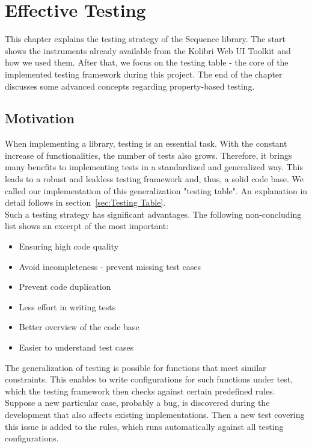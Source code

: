 \chapter{Effective Testing}
\label{chap:Effective_Testing}
This chapter explains the testing strategy of the Sequence library. The start
shows the instruments already available from the Kolibri Web UI Toolkit and how
we used them. After that, we focus on the testing table - the core of
the implemented testing framework during this project. The end of the chapter
discusses some advanced concepts regarding property-based testing.

\section{Motivation}
\label{sec:Motivation}
When implementing a library, testing is an essential task. With the constant
increase of functionalities, the number of tests also grows. Therefore, it
brings many benefits to implementing tests in a standardized and generalized
way. This leads to a robust and leakless testing framework and, thus, a solid
code base. We called our implementation of this generalization "testing table".
An explanation in detail follows in section~\ref{sec:Testing Table}. \\
Such a testing strategy has significant advantages. The following
non-concluding list shows an excerpt of the most important:

\begin{itemize}
  \item{Ensuring high code quality}
  \item{Avoid incompleteness - prevent missing test cases}
  \item{Prevent code duplication}
  \item{Less effort in writing tests}
  \item{Better overview of the code base}
  \item{Easier to understand test cases}
\end{itemize}

The generalization of testing is possible for functions that meet similar
constraints. This enables to write configurations for such functions under
test, which the testing framework then checks against certain predefined rules.
Suppose a new particular case, probably a bug, is discovered during the
development that also affects existing implementations. Then a new test
covering this issue is added to the rules, which runs automatically against all
testing configurations.

